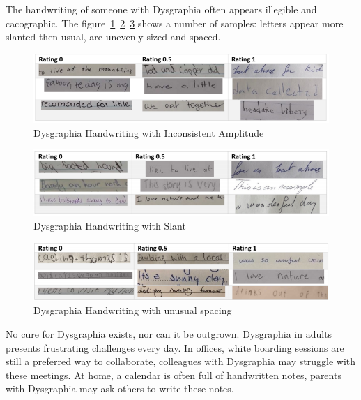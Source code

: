 \documentclass{article}
\begin{document}
The handwriting of someone with Dysgraphia often appears illegible and cacographic. The figure~\ref{fig:amplitude}~\ref{fig:slant}~\ref{fig:spacing} shows a number of samples: letters appear more slanted then usual, are unevenly sized and spaced. 
    \begin{figure}[hbt!]
        \includegraphics[width=12cm]{Capture.ampletude.PNG}
        \centering
        \caption{Dysgraphia Handwriting with Inconsistent Amplitude\cite{Dysgraphia_handwriting_graph}}
        \label{fig:amplitude}
    \end{figure}

    \begin{figure}[hbt!]
        \includegraphics[width=12cm]{Capture.slant.PNG}
        \centering
        \caption{Dysgraphia Handwriting with Slant\cite{Dysgraphia_handwriting_graph}}
        \label{fig:slant}
    \end{figure}
    
     \begin{figure}[hbt!]
        \includegraphics[width=12cm]{Capture.spacing.PNG}
        \centering
        \caption{Dysgraphia Handwriting with unusual spacing\cite{Dysgraphia_handwriting_graph}}
        \label{fig:spacing}
    \end{figure}


No cure for Dysgraphia exists, nor can it be outgrown. Dysgraphia in adults presents frustrating challenges every day. In offices, white boarding sessions are still a preferred way to collaborate, colleagues with Dysgraphia may struggle with these meetings. At home, a calendar is often full of handwritten notes, parents with Dysgraphia may ask others to write these notes.
\end{document}
